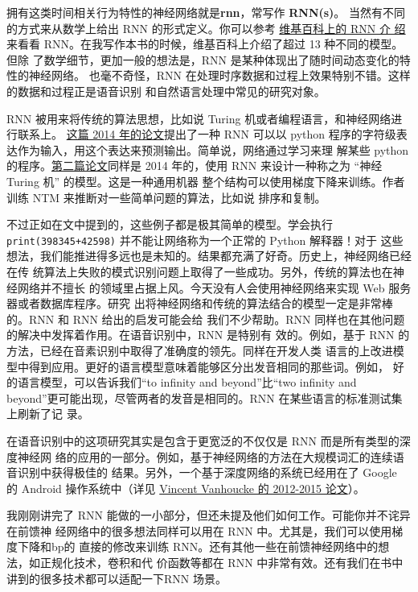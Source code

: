 拥有这类时间相关行为特性的神经网络就是\textbf{\gls{rnn}}，常写作 \textbf{RNN(s)}。
当然有不同的方式来从数学上给出 RNN 的形式定义。你可以参考
\href{http://en.wikipedia.org/wiki/Recurrent_neural_network}{维基百科上的 RNN 介
  绍}来看看 RNN。在我写作本书的时候，维基百科上介绍了超过 13 种不同的模型。但除
了数学细节，更加一般的想法是，RNN 是某种体现出了随时间动态变化的特性的神经网络。
也毫不奇怪，RNN 在处理时序数据和过程上效果特别不错。这样的数据和过程正是语音识别
和自然语言处理中常见的研究对象。

RNN 被用来将传统的算法思想，比如说 Turing 机或者编程语言，和神经网络进行联系上。%
\href{http://arxiv.org/abs/1410.4615}{这篇 2014 年的论文}提出了一种 RNN 可以以
python 程序的字符级表达作为输入，用这个表达来预测输出。简单说，网络通过学习来理
解某些 python 的程序。\href{http://arxiv.org/abs/1410.5401}{第二篇论文}同样是
2014 年的，使用 RNN 来设计一种称之为 “神经 Turing 机” 的模型。这是一种通用机器
整个结构可以使用梯度下降来训练。作者训练 NTM 来推断对一些简单问题的算法，比如说
排序和复制。

不过正如在文中提到的，这些例子都是极其简单的模型。学会执行
\lstinline!print(398345+42598)!  并不能让网络称为一个正常的 Python 解释器！对于
这些想法，我们能推进得多远也是未知的。结果都充满了好奇。历史上，神经网络已经在传
统算法上失败的模式识别问题上取得了一些成功。另外，传统的算法也在神经网络并不擅长
的领域里占据上风。今天没有人会使用神经网络来实现 Web 服务器或者数据库程序。研究
出将神经网络和传统的算法结合的模型一定是非常棒的。RNN 和 RNN 给出的启发可能会给
我们不少帮助。RNN 同样也在其他问题的解决中发挥着作用。在语音识别中，RNN 是特别有
效的。例如，基于 RNN 的方法，已经在音素识别中取得了准确度的领先。同样在开发人类
语言的上改进模型中得到应用。更好的语言模型意味着能够区分出发音相同的那些词。例如，
好的语言模型，可以告诉我们“to infinity and beyond”比“two infinity and
beyond”更可能出现，尽管两者的发音是相同的。RNN 在某些语言的标准测试集上刷新了记
录。

在语音识别中的这项研究其实是包含于更宽泛的不仅仅是 RNN 而是所有类型的深度神经网
络的应用的一部分。例如，基于神经网络的方法在大规模词汇的连续语音识别中获得极佳的
结果。另外，一个基于深度网络的系统已经用在了 Google 的 Android 操作系统中（详见
  \href{http://research.google.com/pubs/VincentVanhoucke.html}{Vincent Vanhoucke
    的 2012-2015 论文}）。

我刚刚讲完了 RNN 能做的一小部分，但还未提及他们如何工作。可能你并不诧异在前馈神
经网络中的很多想法同样可以用在 RNN 中。尤其是，我们可以使用梯度下降和\gls*{bp}的
直接的修改来训练 RNN。还有其他一些在前馈神经网络中的想法，如正规化技术，卷积和代
价函数等都在 RNN 中非常有效。还有我们在书中讲到的很多技术都可以适配一下RNN 场景。\\

